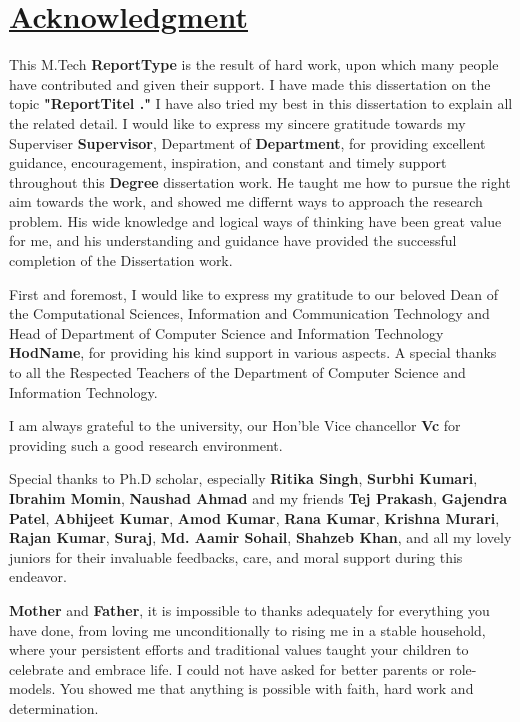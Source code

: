 \chapter*{\centering \uline{Acknowledgment}}


This M.Tech \textbf{ReportType} is the result of hard work, upon which many people have contributed and given their support. I
have made this dissertation on the topic \textbf{"ReportTitel ."} I have also tried my best in this dissertation to
explain all the related detail. I would like to express my sincere gratitude towards my Superviser \textbf{Supervisor}, Department of \textbf{Department}, for providing excellent guidance, encouragement, inspiration, and constant and
timely support throughout this \textbf{Degree}  dissertation work. He taught me how to pursue the right aim towards the work, and showed me differnt ways to approach the research problem. His wide knowledge and logical ways of thinking have been great value for me, and his understanding and guidance have provided the successful completion of the
Dissertation work.

First and foremost, I would like to express my gratitude to our beloved Dean of the Computational Sciences,
Information and Communication Technology and Head of Department of Computer Science and Information Technology \textbf{HodName},
for providing his kind support in various aspects. A special thanks to all the Respected Teachers of the Department of Computer Science and Information Technology.

I am always grateful to the university, our Hon’ble Vice chancellor \textbf{Vc} for providing
such a good research environment.

	Special thanks to Ph.D scholar, especially \textbf{Ritika Singh}, \textbf{Surbhi Kumari}, \textbf{Ibrahim Momin},
\textbf{Naushad Ahmad} and  my friends \textbf{Tej Prakash}, \textbf{Gajendra Patel}, \textbf{Abhijeet Kumar},
\textbf{Amod Kumar}, \textbf{Rana Kumar}, \textbf{Krishna Murari}, \textbf{Rajan Kumar}, \textbf{Suraj}, \textbf{Md.
Aamir Sohail}, \textbf{
	Shahzeb Khan},
and all my lovely juniors  for their invaluable feedbacks, care, and moral support during this endeavor.

	\textbf{Mother} and \textbf{Father}, it is impossible to thanks adequately for everything you have done, from
loving me unconditionally to rising me in a stable household, where your persistent efforts and traditional values
taught your children to celebrate and embrace life. I could not have asked for better parents or role-models. You
showed me that anything is possible with faith, hard work and determination. 



